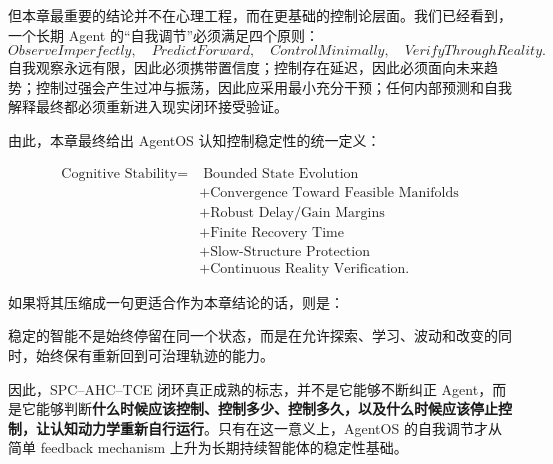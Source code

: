 但本章最重要的结论并不在心理工程，而在更基础的控制论层面。我们已经看到，一个长期 Agent 的“自我调节”必须满足四个原则：
\[
\boxed{
ObserveImperfectly,
\quad
PredictForward,
\quad
ControlMinimally,
\quad
VerifyThroughReality.
}
\]
自我观察永远有限，因此必须携带置信度；控制存在延迟，因此必须面向未来趋势；控制过强会产生过冲与振荡，因此应采用最小充分干预；任何内部预测和自我解释最终都必须重新进入现实闭环接受验证。

由此，本章最终给出 AgentOS 认知控制稳定性的统一定义：

\[
\boxed{
\begin{aligned}
\text{Cognitive Stability}
=
&\;
\text{Bounded State Evolution}
\\
&+
\text{Convergence Toward Feasible Manifolds}
\\
&+
\text{Robust Delay/Gain Margins}
\\
&+
\text{Finite Recovery Time}
\\
&+
\text{Slow-Structure Protection}
\\
&+
\text{Continuous Reality Verification}.
\end{aligned}
}
\]

如果将其压缩成一句更适合作为本章结论的话，则是：

\begin{conclusion}
稳定的智能不是始终停留在同一个状态，而是在允许探索、学习、波动和改变的同时，始终保有重新回到可治理轨迹的能力。
\end{conclusion}

因此，SPC--AHC--TCE 闭环真正成熟的标志，并不是它能够不断纠正 Agent，而是它能够判断\textbf{什么时候应该控制、控制多少、控制多久，以及什么时候应该停止控制，让认知动力学重新自行运行}。只有在这一意义上，AgentOS 的自我调节才从简单 feedback mechanism 上升为长期持续智能体的稳定性基础。
